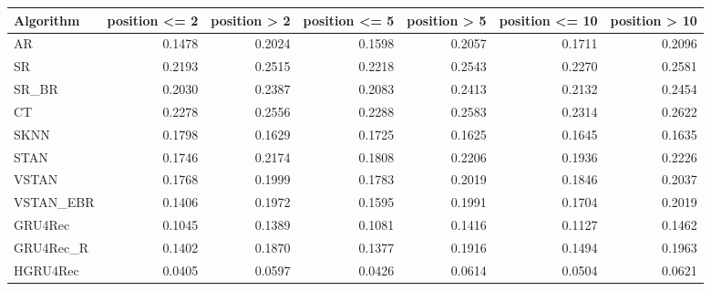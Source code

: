 \begin{tabular}{lrrrrrr}
\toprule
 Algorithm &  position <= 2 &  position > 2 &  position <= 5 &  position > 5 &  position <= 10 &  position > 10 \\
\midrule
        AR &         0.1478 &        0.2024 &         0.1598 &        0.2057 &          0.1711 &         0.2096 \\
        SR &         0.2193 &        0.2515 &         0.2218 &        0.2543 &          0.2270 &         0.2581 \\
     SR\_BR &         0.2030 &        0.2387 &         0.2083 &        0.2413 &          0.2132 &         0.2454 \\
        CT &         0.2278 &        0.2556 &         0.2288 &        0.2583 &          0.2314 &         0.2622 \\
      SKNN &         0.1798 &        0.1629 &         0.1725 &        0.1625 &          0.1645 &         0.1635 \\
      STAN &         0.1746 &        0.2174 &         0.1808 &        0.2206 &          0.1936 &         0.2226 \\
     VSTAN &         0.1768 &        0.1999 &         0.1783 &        0.2019 &          0.1846 &         0.2037 \\
 VSTAN\_EBR &         0.1406 &        0.1972 &         0.1595 &        0.1991 &          0.1704 &         0.2019 \\
   GRU4Rec &         0.1045 &        0.1389 &         0.1081 &        0.1416 &          0.1127 &         0.1462 \\
 GRU4Rec\_R &         0.1402 &        0.1870 &         0.1377 &        0.1916 &          0.1494 &         0.1963 \\
  HGRU4Rec &         0.0405 &        0.0597 &         0.0426 &        0.0614 &          0.0504 &         0.0621 \\
\bottomrule
\end{tabular}
